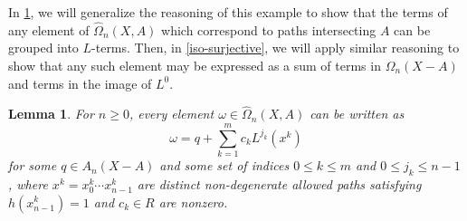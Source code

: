 \documentclass[11pt]{article}
\newtheorem{lemma}[theo]{Lemma}
\theoremstyle{definition}
\numberwithin{equation}{section}
\newcommand{\tOmega}{\widehat{\Omega}}
\begin{document}
In \cref{iso-surjective-forward}, we will generalize the reasoning of this example to show that the terms of any element of $\tOmega_n(X,A)$ which correspond to paths intersecting $A$ can be grouped into $L$-terms. Then, in \cref{iso-surjective}, we will apply similar reasoning to show that any such element may be expressed as a sum of terms in $\Omega_n(X-A)$ and terms in the image of $L^0$.

\begin{lemma}\label{iso-surjective-forward}
For $n \geq 0$, every element  $\omega \in \tOmega_n(X,A)$ can be written as 
\[
\omega = q + \sum_{k=1}^m c_k L^{j_k}(x^k) 
\]
for some $q \in A_n(X-A)$ and some set of indices $0 \leq k \leq m$ and $0 \leq j_k \leq n - 1$, where $x^k = x^k_0 \cdots x^k_{n-1}$ are distinct non-degenerate allowed paths satisfying $h(x^k_{n-1}) = 1$ and $c_k \in R$ are nonzero. 
\end{lemma}
\end{document}
